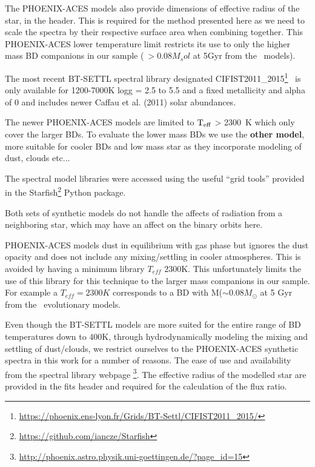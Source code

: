 The PHOENIX-ACES models also provide dimensions of effective radius of the star, in the header. This is required for the method presented here as we need to scale the spectra by their respective surface area when combining together.
This PHOENIX-ACES lower temperature limit restricts its use to only the higher mass BD companions in our sample (\(~>0.08 M_sol\) at 5Gyr from the~\cite{baraffe_evolutionary_2003} models). 


The most recent BT-SETTL spectral library designated CIFIST2011\_2015\footnote{\url{https://phoenix.ens-lyon.fr/Grids/BT-Settl/CIFIST2011_2015/}}~\cite{baraffe_new_2015} is only available for 1200-7000K logg = 2.5 to 5.5 and a fixed metallicity and alpha of 0 and includes newer Caffau et al. (2011) solar abundances.

The newer PHOENIX-ACES models are limited to \(\rm T_{eff} \) > 2300~K which only cover the larger BDs. To evaluate the lower mass BDs we use the \textbf{other model}, more suitable for cooler BDs and low mass star as they incorporate modeling of dust, clouds etc...


The spectral model libraries were accessed using the useful ``grid tools'' provided in the  Starfish\footnote{\url{https://github.com/iancze/Starfish}} Python package\citep{czekala_constructing_2015}.


Both sets of synthetic models do not handle the affects of radiation from a neighboring star, which may have an affect on the binary orbits here.



PHOENIX-ACES models dust in equilibrium with gas phase but ignores the dust opacity and does not include any mixing/settling in cooler atmospheres. This is avoided by having a minimum library \(T_{eff}\) 2300K. This unfortunately limits the use of this library for this technique to the larger mass companions in our sample. For example a \(T_{eff}=2300K\) corresponds to a BD with M(\(\sim0.08 M_{\odot}\) at 5 Gyr from the~\cite{baraffe_evolutionary_2003} evolutionary models. 


Even though the BT-SETTL models are more suited for the entire range of BD temperatures down to 400K, through hydrodynamically modeling the mixing and settling of dust/clouds, we restrict ourselves to the PHOENIX-ACES synthetic spectra in this work for a number of reasons. The ease of use and availability from the spectral library webpage \footnote{\url{http://phoenix.astro.physik.uni-goettingen.de/?page_id=15}}. The effective radius of the modelled star are provided in the fits header and required for the calculation of the flux ratio.



